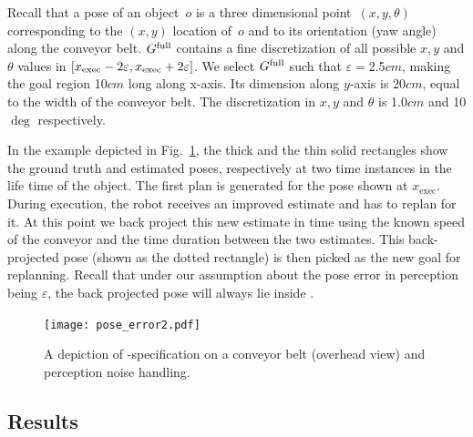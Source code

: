 \documentclass[a4paper]{report}
\begin{document}
%
Recall that a pose of an object~$o$ is a three dimensional point~$(x,y,\theta)$ corresponding to the $(x,y)$ location of~$o$ and to its orientation (yaw angle) along the conveyor belt.
%
$G^{\textrm{full}}$ contains a fine discretization of all possible $x,y$ and $\theta$ values in  $[x_{\textrm{exec}}-2\varepsilon, x_{\textrm{exec}}+2\varepsilon]$.
We select $G^{\textrm{full}}$ such that $\varepsilon = $2.5$cm$, making the goal region 10$cm$ long along x-axis. Its dimension along $y$-axis is 20$cm$, equal to the width of the conveyor belt. The discretization in $x,y$ and $\theta$ is 1.0$cm$ and 10$\deg$ respectively.

In the example depicted in Fig.~\ref{fig:pe}, the thick and the thin solid rectangles show the ground truth and estimated poses, respectively at two time instances in the life time of the object.
%
The first plan is generated for the pose shown at $x_{\textrm{exec}}$. During execution, the robot receives an improved estimate and has to replan for it. At this point we back project this new estimate in time using the known speed of the conveyor and the time duration between the two estimates. This back-projected pose (shown as the dotted rectangle) is then picked as the new goal for replanning. Recall that under our assumption about the pose error in perception being $\varepsilon$, the back projected pose will always lie inside \Gfull.
%



\begin{figure}
    \centering
    \texttt{[image: pose\_error2.pdf]}
    \caption{\CaptionTextSize A depiction of \Gfull-specification on a conveyor belt (overhead view) and perception noise handling. 
    }
    \label{fig:pe}
\end{figure}

\subsection{Results}
%
\end{document}

